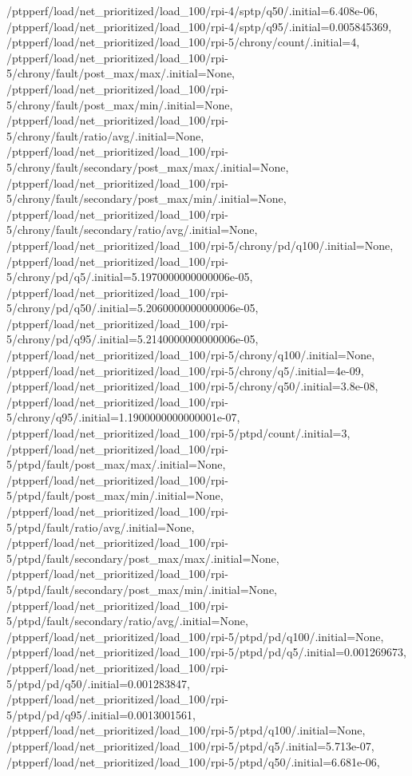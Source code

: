 {    /ptpperf/load/net_prioritized/load_100/rpi-4/sptp/q50/.initial=6.408e-06,
    /ptpperf/load/net_prioritized/load_100/rpi-4/sptp/q95/.initial=0.005845369,
    /ptpperf/load/net_prioritized/load_100/rpi-5/chrony/count/.initial=4,
    /ptpperf/load/net_prioritized/load_100/rpi-5/chrony/fault/post_max/max/.initial=None,
    /ptpperf/load/net_prioritized/load_100/rpi-5/chrony/fault/post_max/min/.initial=None,
    /ptpperf/load/net_prioritized/load_100/rpi-5/chrony/fault/ratio/avg/.initial=None,
    /ptpperf/load/net_prioritized/load_100/rpi-5/chrony/fault/secondary/post_max/max/.initial=None,
    /ptpperf/load/net_prioritized/load_100/rpi-5/chrony/fault/secondary/post_max/min/.initial=None,
    /ptpperf/load/net_prioritized/load_100/rpi-5/chrony/fault/secondary/ratio/avg/.initial=None,
    /ptpperf/load/net_prioritized/load_100/rpi-5/chrony/pd/q100/.initial=None,
    /ptpperf/load/net_prioritized/load_100/rpi-5/chrony/pd/q5/.initial=5.1970000000000006e-05,
    /ptpperf/load/net_prioritized/load_100/rpi-5/chrony/pd/q50/.initial=5.2060000000000006e-05,
    /ptpperf/load/net_prioritized/load_100/rpi-5/chrony/pd/q95/.initial=5.2140000000000006e-05,
    /ptpperf/load/net_prioritized/load_100/rpi-5/chrony/q100/.initial=None,
    /ptpperf/load/net_prioritized/load_100/rpi-5/chrony/q5/.initial=4e-09,
    /ptpperf/load/net_prioritized/load_100/rpi-5/chrony/q50/.initial=3.8e-08,
    /ptpperf/load/net_prioritized/load_100/rpi-5/chrony/q95/.initial=1.1900000000000001e-07,
    /ptpperf/load/net_prioritized/load_100/rpi-5/ptpd/count/.initial=3,
    /ptpperf/load/net_prioritized/load_100/rpi-5/ptpd/fault/post_max/max/.initial=None,
    /ptpperf/load/net_prioritized/load_100/rpi-5/ptpd/fault/post_max/min/.initial=None,
    /ptpperf/load/net_prioritized/load_100/rpi-5/ptpd/fault/ratio/avg/.initial=None,
    /ptpperf/load/net_prioritized/load_100/rpi-5/ptpd/fault/secondary/post_max/max/.initial=None,
    /ptpperf/load/net_prioritized/load_100/rpi-5/ptpd/fault/secondary/post_max/min/.initial=None,
    /ptpperf/load/net_prioritized/load_100/rpi-5/ptpd/fault/secondary/ratio/avg/.initial=None,
    /ptpperf/load/net_prioritized/load_100/rpi-5/ptpd/pd/q100/.initial=None,
    /ptpperf/load/net_prioritized/load_100/rpi-5/ptpd/pd/q5/.initial=0.001269673,
    /ptpperf/load/net_prioritized/load_100/rpi-5/ptpd/pd/q50/.initial=0.001283847,
    /ptpperf/load/net_prioritized/load_100/rpi-5/ptpd/pd/q95/.initial=0.0013001561,
    /ptpperf/load/net_prioritized/load_100/rpi-5/ptpd/q100/.initial=None,
    /ptpperf/load/net_prioritized/load_100/rpi-5/ptpd/q5/.initial=5.713e-07,
    /ptpperf/load/net_prioritized/load_100/rpi-5/ptpd/q50/.initial=6.681e-06,
}
